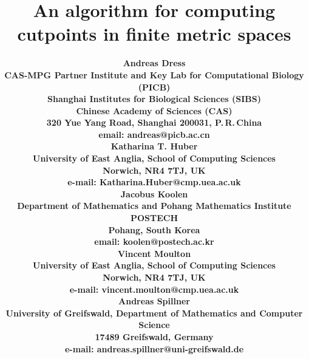 \documentclass[12pt]{article}
\begin{document}
\title{An algorithm for computing cutpoints in finite metric spaces}

{\tiny
\author{\bf{Andreas Dress}\\
\small{CAS-MPG Partner Institute and Key Lab for Computational Biology (PICB)}\\
\small{Shanghai Institutes for Biological Sciences (SIBS)}\\
\small{Chinese Academy of Sciences (CAS)}\\
\small{320 Yue Yang Road, Shanghai 200031, P.\,R.\,China}\\
\small{email: andreas@picb.ac.cn}\\
\bf{Katharina T. Huber}\\
\small{University of East Anglia, School of Computing Sciences}\\
\small{Norwich, NR4 7TJ, UK}\\
\small{e-mail: Katharina.Huber@cmp.uea.ac.uk}\\ 
\bf{Jacobus Koolen}\\
\small{Department of Mathematics and Pohang Mathematics Institute}\\
\small{POSTECH}\\
\small{Pohang, South Korea}\\
\small{email: koolen@postech.ac.kr}\\ 
\bf{Vincent Moulton}\\
\small{University of East Anglia, School of Computing Sciences}\\
\small{Norwich, NR4 7TJ, UK}\\
\small{e-mail: vincent.moulton@cmp.uea.ac.uk}\\ 
\bf{Andreas Spillner}\\
\small{University of Greifswald, Department of Mathematics and Computer Science}\\
\small{17489 Greifswald, Germany}\\
\small{e-mail: andreas.spillner@uni-greifswald.de}\\
}}

\date{}

\maketitle

\newpage 
\end{document}

